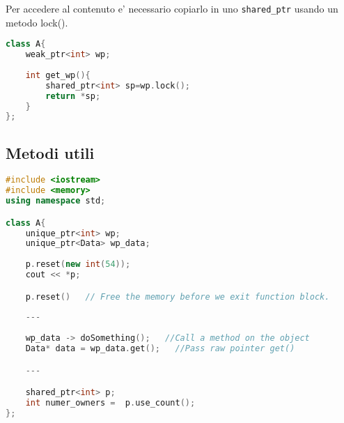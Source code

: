 Per accedere al contenuto e’ necessario copiarlo in
uno \verb|shared_ptr| usando un metodo lock().

\begin{lstlisting}[language=C++]
class A{
    weak_ptr<int> wp; 
    
    int get_wp(){
        shared_ptr<int> sp=wp.lock();
        return *sp;
    }
}; 
\end{lstlisting}


\subsection{Metodi utili}

\begin{lstlisting}[language=C++]
#include <iostream>
#include <memory> 
using namespace std;

class A{
    unique_ptr<int> wp; 
    unique_ptr<Data> wp_data; 
    
    p.reset(new int(54)); 
    cout << *p;

    p.reset()   // Free the memory before we exit function block.
    
    ---
    
    wp_data -> doSomething();   //Call a method on the object
    Data* data = wp_data.get();   //Pass raw pointer get()

    ---

    shared_ptr<int> p;
    int numer_owners =  p.use_count();
}; 
\end{lstlisting}